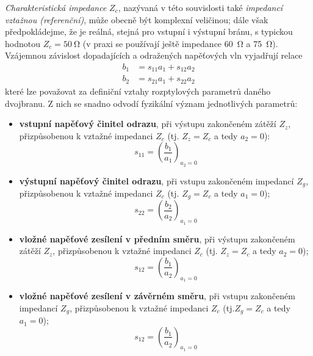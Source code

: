       \emph{Charakteristická impedance} \(Z_c\), nazývaná v této souvislosti také \emph{impedancí 
      vztažnou (referenční)}, může obecně být komplexní veličinou; dále však předpokládejme, že je 
      reálná, stejná pro vstupní i výstupní bránu, s typickou hodnotou \(Z_c = \SI{50}{\ohm}\) (v 
      praxi se používají ještě impedance \SI{60}{\ohm} a \SI{75}{\ohm}). Vzájemnou závislost 
      dopadajících a odražených napěťových vln vyjadřují relace
      \begin{align}\label{RA:eq_03}
      b_1 &= s_{11}a_1 + s_{12}a_2   \\ 
      b_2 &= s_{21}a_1 + s_{22}a_2
      \end{align}
      které lze považovat za definiční vztahy rozptylových parametrů daného dvojbranu. Z nich se 
      snadno odvodí fyzikální význam jednotlivých parametrů:
      \begin{itemize}
        \item \textbf{vstupní napěťový činitel odrazu}, při výstupu zakončeném zátěží \(Z_z\), 
              přizpůsobenou k vztažné impedanci \(Z_c\)  (tj. \(Z_z = Z_c\) a tedy \(a_2 = 0\)):
              \begin{equation*}
                s_{11} = \left(\dfrac{b_1}{a_1}\right)_{a_2=0}
              \end{equation*}
        \item \textbf{výstupní napěťový činitel odrazu}, při vstupu zakončeném impedancí \(Z_g\), 
               přizpůsobenou k vztažné impedanci \(Z_c\) (tj. \(Z_g = Z_c\) a tedy \(a_1 = 0\)); 
              \begin{equation*}
                 s_{22} = \left(\dfrac{b_2}{a_2}\right)_{a_1=0}
              \end{equation*}
        \item \textbf{vložné napěťové zesílení v předním směru}, při výstupu zakončeném zátěží 
              \(Z_z\), přizpůsobenou k vztažné impedanci \(Z_c\) (tj. \(Z_z = Z_c\) a tedy \(a_2 = 
              0\));
              \begin{equation*}
                 s_{12} = \left(\dfrac{b_1}{a_2}\right)_{a_1=0}
              \end{equation*}
        \item \textbf{vložné napěťové zesílení v závěrném směru}, při vstupu zakončeném impedancí 
              \(Z_g\), přizpůsobenou k vztažné impedanci \(Z_c\) (tj.\(Z_g = Z_c\) a tedy \(a_1 = 
              0\)); \\
              \begin{equation*}
                 s_{12} = \left(\dfrac{b_1}{a_2}\right)_{a_1=0}
              \end{equation*}
      \end{itemize}
      
